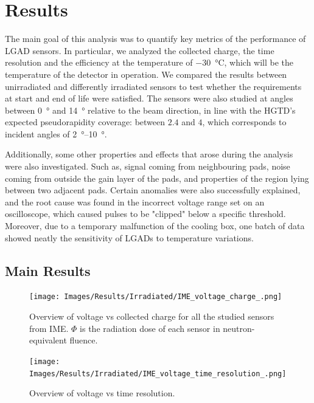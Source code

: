\chapter{Results}\label{chap:results}

The main goal of this analysis was to quantify key metrics of the performance of LGAD sensors. In particular, we analyzed the collected charge, the time resolution and the efficiency at the temperature of \qty{-30}{\degreeCelsius}, which will be the temperature of the detector in operation. We compared the results between unirradiated and differently irradiated sensors to test whether the requirements at start and end of life were satisfied. The sensors were also studied at angles between \qty{0}{\degree} and \qty{14}{\degree} relative to the beam direction, in line with the HGTD's expected pseudorapidity coverage: between \(2.4\) and \(4\), which corresponds to incident angles of \qtyrange{2}{10}{\degree}.

Additionally, some other properties and effects that arose during the analysis were also investigated. Such as, signal coming from neighbouring pads, noise coming from outside the gain layer of the pads, and properties of the region lying between two adjacent pads. Certain anomalies were also successfully explained, and the root cause was found in the incorrect voltage range set on an oscilloscope, which caused pulses to be "clipped" below a specific threshold. Moreover, due to a temporary malfunction of the cooling box, one batch of data showed neatly the sensitivity of LGADs to temperature variations.

\section{Main Results}

\begin{figure}[h!tbp]
    \centering
    \texttt{[image: Images/Results/Irradiated/IME\_voltage\_charge\_.png]}
    \captionsetup{width=\captionwidth}
    \caption{Overview of voltage vs collected charge for all the studied sensors from IME. \(\Phi\) is the radiation dose of each sensor in neutron-equivalent fluence.}
    \label{fig:irradiated_IME_voltage_charge}
\end{figure}


\begin{figure}[h!tbp]
    \centering
    \texttt{[image: Images/Results/Irradiated/IME\_voltage\_time\_resolution\_.png]}
    \captionsetup{width=\captionwidth}
    \caption{Overview of voltage vs time resolution.}
    \label{fig:irradiated_IME_voltage_time_res}
\end{figure}

